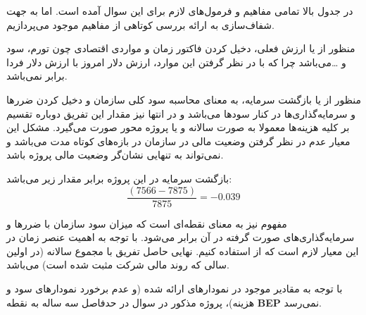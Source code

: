 در جدول بالا تمامی مفاهیم و فرمول‌های لازم برای این سوال آمده است. اما به جهت شفاف‌سازی به ارائه بررسی کوتاهی از مفاهیم موجود می‌پردازیم.

منظور از 
\textbf{}
یا ارزش فعلی، دخیل کردن فاکتور زمان و مواردی اقتصادی چون تورم، سود و \ldots می‌باشد چرا که با در نظر گرفتن این موارد، ارزش دلار امروز با ارزش دلار فردا برابر نمی‌باشد.

منظور از 
\textbf{}
یا بازگشت سرمایه، به معنای محاسبه سود کلی سازمان و دخیل کردن ضررها و سرمایه‌گذاری‌ها در کنار سودها می‌باشد و در انتها نیز مقدار این تفریق دوباره تقسیم بر کلیه هزینه‌ها معمولا به صورت سالانه و یا پروژه محور صورت می‌گیرد. مشکل این معیار عدم در نظر گرفتن وضعیت مالی در سازمان در بازه‌های کوتاه مدت می‌باشد و نمی‌تواند به تنهایی نشان‌گر وضعیت مالی پروژه باشد.

بازگشت سرمایه در این پروژه برابر مقدار زیر می‌باشد:
\[
\frac{(7566 - 7875)}{7875} = -0.039
\]

مفهوم 
\textbf{}
نیز به معنای نقطه‌ای است که میزان سود سازمان با ضررها و سرمایه‌گذاری‌های صورت گرفته در آن برابر می‌شود. با توجه به اهمیت عنصر زمان در این معیار لازم است که از 
\textbf{} استفاده کنیم. نهایی حاصل تفریق 
\textbf{} با مجموع \textbf{} سالانه (در اولین سالی که روند مالی شرکت مثبت شده است) می‌باشد.

با توجه به مقادیر موجود در نمودارهای ارائه شده (و عدم برخورد نمودار‌های سود و هزینه)، پروژه مذکور در سوال در حدفاصل سه ساله به نقطه \textbf{BEP} نمی‌رسد.
